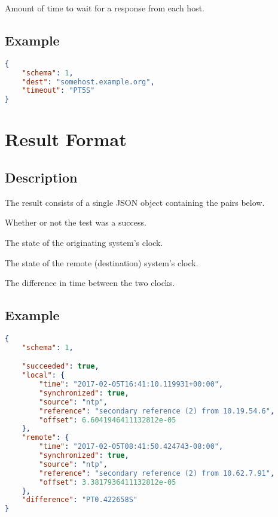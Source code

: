 \documentclass[10pt]{article}
\begin{document}
 Amount of time to wait for a response
from each host.



\subsection{Example}
\begin{lstlisting}[language=json]
{
    "schema": 1,
    "dest": "somehost.example.org",
    "timeout": "PT5S"
}
\end{lstlisting}



%
%

\section{Result Format}

\subsection{Description}
The result consists of a single JSON object containing the pairs
below.  \seejson

 Whether or not the test was a success.

 The state of the originating system's
clock.

 The state of the remote (destination)
system's clock.

 The difference in time between the
two clocks.

\subsection{Example}
\begin{lstlisting}[language=json]
{
    "schema": 1,

    "succeeded": true,
    "local": {
        "time": "2017-02-05T16:41:10.119931+00:00",
        "synchronized": true,
        "source": "ntp",
        "reference": "secondary reference (2) from 10.19.54.6",
        "offset": 6.6041946411132812e-05
    },
    "remote": {
        "time": "2017-02-05T08:41:50.424743-08:00",
        "synchronized": true,
        "source": "ntp",
        "reference": "secondary reference (2) from 10.62.7.91",
        "offset": 3.3817936411132812e-05
    },
    "difference": "PT0.422658S"
}
\end{lstlisting}
\end{document}
